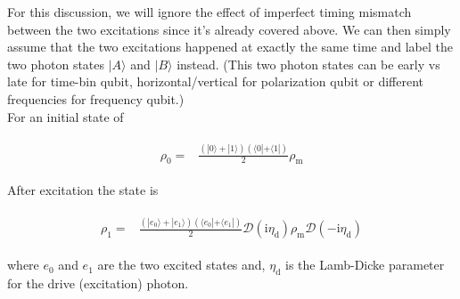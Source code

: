 \documentclass[10pt,fleqn]{article}
\newcommand{\ui}{\mathrm{i}}
\newcommand{\eqar}[1]
{
  \begin{align}
    #1
  \end{align}
}
\newcommand{\paren}[1]{{\left({#1}\right)}}
\begin{document}
For this discussion, we will ignore the effect of imperfect timing mismatch between
the two excitations since it's already covered above. We can then simply assume
that the two excitations happened at exactly the same time and label the two photon
states $|A\rangle$ and $|B\rangle$ instead. (This two photon states can be
early vs late for time-bin qubit, horizontal/vertical for polarization qubit
or different frequencies for frequency qubit.)\\

For an initial state of
\eqar{
  \begin{split}
    \rho_0=&\frac{\paren{|0\rangle+|1\rangle}\paren{\langle0|+\langle1|}}{2}\rho_{\mathrm{m}}
  \end{split}
}
After excitation the state is
\eqar{
  \begin{split}
    \rho_1=&\frac{\paren{|e_0\rangle+|e_1\rangle}\paren{\langle e_0|+\langle e_1|}}{2}\mathcal{D}(\ui\eta_{\mathrm{d}})\rho_{\mathrm{m}}\mathcal{D}(-\ui\eta_{\mathrm{d}})
  \end{split}
}
where $e_0$ and $e_1$ are the two excited states and,
$\eta_{\mathrm{d}}$ is the Lamb-Dicke parameter for the drive (excitation) photon.\\
\end{document}
